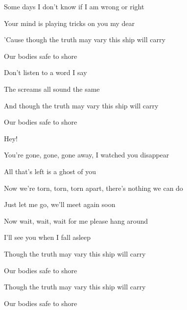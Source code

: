 \begin{song}
\bigskip

Some days I don't know if I am wrong or right \par
Your mind is playing tricks on you my dear \par
'Cause though the truth may vary this  ship will carry \par
{} \par
Our bodies safe to shore  \par

\bigskip

\begin{chorusbox}{\Chorus}
Don't listen to a word I say  \par
The screams all sound the same  \par
And though the truth may vary this  ship will carry \par
Our bodies safe to shore \par
\end{chorusbox}

\bigskip

   Hey!  \par

\bigskip

You're gone, gone, gone away, I watched you disappear \par
All that's left is a ghost of you \par
Now we're torn, torn, torn apart, there's nothing we can do \par
Just let me go, we'll meet again soon \par
Now wait, wait, wait for me  please hang around \par
{} \par
I'll see you when I fall asleep  \par

\bigskip

\Chorus {}

\bigskip

 \par
Though the truth may vary this  ship will carry \par
Our bodies safe to shore  \par
Though the truth may vary this  ship will carry \par
Our bodies safe to shore  \par

\end{song}

